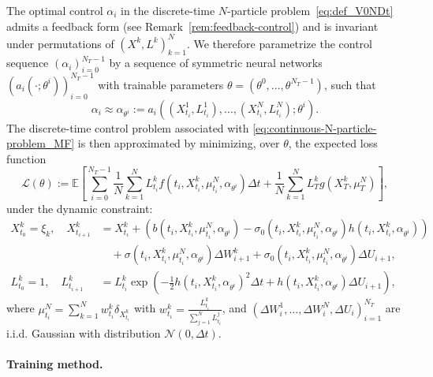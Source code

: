 \documentclass[11pt]{article}
\numberwithin{equation}{section}
\theoremstyle{plain}
\theoremstyle{definition}
\theoremstyle{remark}
\begin{document}
	The optimal control $\alpha_i$ in the discrete-time $N$-particle problem~\eqref{eq:def_V0NDt} admits a feedback form (see Remark~\ref{rem:feedback-control}) and is invariant under permutations of $(X^k, L^k)_{k=1}^N$. We therefore parametrize the control sequence $(\alpha_i)_{i=0}^{N_T-1}$ by a sequence of symmetric neural networks $(a_i(\cdot;\theta^i))_{i=0}^{N_T-1}$ with trainable parameters $\theta = (\theta^0,\dots, \theta^{N_T-1})$, such that 
	$$\alpha_i \approx \alpha_{\theta^i} := a_i\left((X_{t_i}^1, L_{t_i}^1),\dots, (X_{t_i}^N, L_{t_i}^N); \theta^i\right).$$ 
	The discrete-time control problem associated with \eqref{eq:continuous-N-particle-problem_MF} is then approximated by minimizing, over $\theta$, the expected loss function 
	\begin{equation*}
		\mathcal{L}(\theta) := \mathbb{E}\left[ \sum_{i=0}^{N_T-1} \frac{1}{N}\sum_{k=1}^N L_{t_i}^{k} f\left(t_i, X_{t_i}^{k}, \mu_{t_i}^{N}, \alpha_{\theta^i}\right) \Delta t + \frac{1}{N}\sum_{k=1}^N L_T^{k} g(X_T^{k}, \mu_T^{N}) \right], 
	\end{equation*}
	under the dynamic constraint: 
	\begin{equation} \label{eq:sample-trajectory}
		\begin{aligned}
			X_{t_0}^k = \xi_k, \quad X_{t_{i+1}}^k &= X_{t_i}^k + \left(b(t_i, X_{t_i}^k, \mu_{t_i}^N, \alpha_{\theta^i}) - \sigma_0(t_i, X_{t_i}^k, \mu_{t_i}^N, \alpha_{\theta^i})h(t_i,X_{t_i}^k,\alpha_{\theta^i}) \right) \\
			&\quad + \sigma(t_i, X_{t_i}^k, \mu_{t_i}^N, \alpha_{\theta^i}) \Delta W_{i+1}^k + \sigma_0(t_i, X_{t_i}^k, \mu_{t_i}^N, \alpha_{\theta^i})\Delta U_{i+1}, \\
			L_{t_0}^k = 1,\quad  L_{t_{i+1}}^k &= L_{t_i}^k\exp\left( -\frac{1}{2}h(t_i, X_{t_i}^k, \alpha_{\theta^i})^2\Delta t + h(t_i, X_{t_i}^k, \alpha_{\theta^i})\Delta U_{i+1} \right), 
		\end{aligned}
	\end{equation}
	where $\mu_{t_i}^N = \sum_{k=1}^N w_{t_i}^k \delta_{X_{t_i}^k}$ with $w_{t_i}^k = \frac{L_{t_i}^k}{\sum_{j=1}^N L_{t_i}^j}$, and $(\Delta W_{i}^1, \dots, \Delta W_i^N, \Delta U_i)_{i=1}^{N_T}$ are i.i.d. Gaussian with distribution $\mathcal{N}(0,\Delta t)$. 
	
	\paragraph{Training method.}
	
\end{document}
